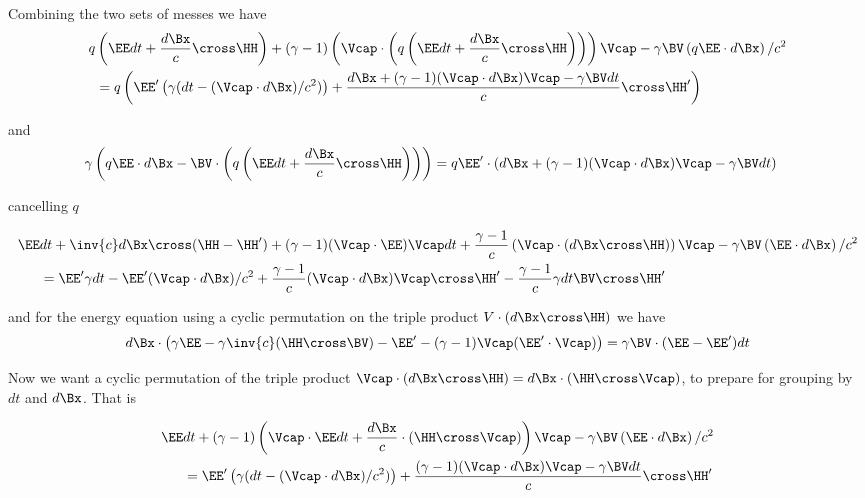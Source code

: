 Combining the two sets of messes we have
\begin{align*}
q &\left( \EE dt + \frac{d\Bx}{c} \cross \HH \right) + (\gamma-1)\left(\Vcap \cdot \left(q \left( \EE dt + \frac{d\Bx}{c} \cross \HH \right)\right)\right) \Vcap - \gamma \BV \left( q \EE \cdot d\Bx \right)/c^2  \\
&=q \left( \EE' \left(\gamma ( dt - (\Vcap \cdot d\Bx )/c^2 )\right) + \frac{d\Bx + (\gamma-1)(\Vcap \cdot d\Bx) \Vcap - \gamma \BV dt}{c} \cross \HH' \right)  \\
\end{align*}

and
\begin{align*}
\gamma &\left( q \EE \cdot d\Bx - \BV \cdot \left(q \left( \EE dt + \frac{d\Bx}{c} \cross \HH \right)\right) \right) 
=
q \EE' \cdot \left(d\Bx + (\gamma-1)(\Vcap \cdot d\Bx) \Vcap - \gamma \BV dt\right)
\end{align*}

cancelling $q$

\begin{align*}
\EE &dt 
+ \inv{c} d\Bx \cross (\HH - \HH')
+ (\gamma-1)(\Vcap \cdot \EE) \Vcap dt 
+ \frac{\gamma-1}{c}\left(\Vcap \cdot \left( d\Bx \cross \HH \right)\right) \Vcap 
- \gamma \BV \left( \EE \cdot d\Bx \right)/c^2  \\
&=
\EE' \gamma dt 
-\EE' (\Vcap \cdot d\Bx )/c^2 
+ \frac{\gamma-1}{c} (\Vcap \cdot d\Bx) \Vcap \cross \HH' 
- \frac{\gamma-1}{c}\gamma dt \BV \cross \HH' 
\end{align*}

and for the energy equation using a cyclic permutation on the triple product $V \cdot (d\Bx \cross \HH)$ we have
\begin{align*}
d\Bx \cdot \left( \gamma \EE 
- \gamma \inv{c} (\HH \cross \BV)
-\EE' - (\gamma-1) \Vcap (\EE' \cdot \Vcap)
\right)
= \gamma \BV \cdot (\EE -\EE')dt 
\end{align*}

Now we want a cyclic permutation of the triple product $\Vcap \cdot (d\Bx \cross \HH) = d\Bx \cdot (\HH \cross \Vcap)$, to prepare for grouping by $dt$ and $d\Bx$.  That is

\begin{align*}
\EE &dt 
+ (\gamma-1)\left(
\Vcap \cdot \EE dt 
+\frac{d\Bx}{c} \cdot (\HH \cross \Vcap)
\right) \Vcap - \gamma \BV \left( \EE \cdot d\Bx \right)/c^2  \\
&=
\EE' \left(\gamma ( dt - (\Vcap \cdot d\Bx )/c^2 )\right) + \frac{(\gamma-1)(\Vcap \cdot d\Bx) \Vcap - \gamma \BV dt}{c} \cross \HH' 
\end{align*}

